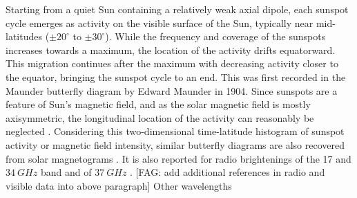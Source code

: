 \documentclass{aa}
\newcommand{\fag}[1]{\textcolor{midpurple}{[FAG: #1]}} %
\begin{document}
  Starting from a quiet Sun containing a relatively weak axial dipole,
  each sunspot cycle emerges as
  activity on the visible surface of the Sun, typically near mid-latitudes
  ($\pm20^{\circ}$ to $\pm 30^{\circ}$).
  While the frequency and coverage of the sunspots increases towards a maximum,
  the location of the activity drifts equatorward. 
  This migration continues after the maximum with decreasing activity
  closer to the equator, bringing the sunspot cycle to an end.
  This was first recorded in the Maunder butterfly diagram by Edward Maunder
  in 1904.
  Since sunspots are a feature of Sun's magnetic field, and as the solar
  magnetic field is mostly axisymmetric, 
  the longitudinal location of the
  activity can reasonably be neglected \citep{PBKT06}.
  Considering this two-dimensional time-latitude histogram of sunspot activity
  or magnetic field intensity, similar butterfly 
  diagrams are also recovered from solar magnetograms
  \citep{GHHZ83,VLMCS12,LUSDADM17}.
  It is also reported for radio brightenings of the 17 and $\SI{34}{GHz}$ band
  \citep{Shibasaki13,SCGVPS14} and of $\SI{37}{GHz}$ \citep{metsahovi40}.
  \fag{add additional references in radio and visible data into above paragraph}
  Other wavelengths  \citep{Loukitcheva19} 
 
\end{document}
